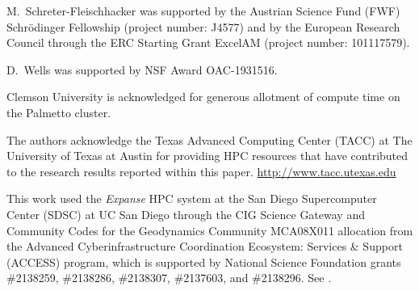 \documentclass{ansarticle-preprint}
\begin{document}
M.~Schreter-Fleischhacker was supported by the Austrian Science Fund (FWF) Schrödinger Fellowship (project number: J4577) and by the European Research Council
through the ERC Starting Grant ExcelAM (project number: 101117579).

D.~Wells was supported by NSF Award OAC-1931516.

Clemson University is acknowledged for generous allotment of compute
time on the Palmetto cluster.

The authors acknowledge the Texas Advanced Computing Center (TACC) at The University of Texas at Austin for providing HPC resources that have contributed to the research results reported within this paper. \url{http://www.tacc.utexas.edu}

This work used the \textit{Expanse} HPC system at the San Diego Supercomputer Center (SDSC) at UC San Diego through the CIG Science Gateway and Community Codes for the Geodynamics Community MCA08X011 allocation from the Advanced Cyberinfrastructure Coordination Ecosystem: Services \& Support (ACCESS) program, which is supported by National Science Foundation grants \#2138259, \#2138286, \#2138307, \#2137603, and \#2138296. See \cite{Boerner2023}.


{}

\end{document}
